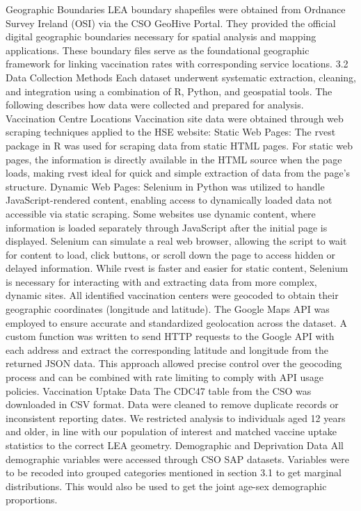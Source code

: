 \documentclass{article}
\begin{document}
Geographic Boundaries LEA boundary shapefiles were obtained from
Ordnance Survey Ireland (OSI) via the CSO GeoHive Portal. They provided
the official digital geographic boundaries necessary for spatial
analysis and mapping applications. These boundary files serve as the
foundational geographic framework for linking vaccination rates with
corresponding service locations. 3.2 Data Collection Methods Each
dataset underwent systematic extraction, cleaning, and integration using
a combination of R, Python, and geospatial tools. The following
describes how data were collected and prepared for analysis. Vaccination
Centre Locations Vaccination site data were obtained through web
scraping techniques applied to the HSE website: Static Web Pages: The
rvest package in R was used for scraping data from static HTML pages.
For static web pages, the information is directly available in the HTML
source when the page loads, making rvest ideal for quick and simple
extraction of data from the page's structure. Dynamic Web Pages:
Selenium in Python was utilized to handle JavaScript-rendered content,
enabling access to dynamically loaded data not accessible via static
scraping. Some websites use dynamic content, where information is loaded
separately through JavaScript after the initial page is displayed.
Selenium can simulate a real web browser, allowing the script to wait
for content to load, click buttons, or scroll down the page to access
hidden or delayed information. While rvest is faster and easier for
static content, Selenium is necessary for interacting with and
extracting data from more complex, dynamic sites. All identified
vaccination centers were geocoded to obtain their geographic coordinates
(longitude and latitude). The Google Maps API was employed to ensure
accurate and standardized geolocation across the dataset. A custom
function was written to send HTTP requests to the Google API with each
address and extract the corresponding latitude and longitude from the
returned JSON data. This approach allowed precise control over the
geocoding process and can be combined with rate limiting to comply with
API usage policies. Vaccination Uptake Data The CDC47 table from the CSO
was downloaded in CSV format. Data were cleaned to remove duplicate
records or inconsistent reporting dates. We restricted analysis to
individuals aged 12 years and older, in line with our population of
interest and matched vaccine uptake statistics to the correct LEA
geometry. Demographic and Deprivation Data All demographic variables
were accessed through CSO SAP datasets. Variables were to be recoded
into grouped categories mentioned in section 3.1 to get marginal
distributions. This would also be used to get the joint age-sex
demographic proportions.
\end{document}
